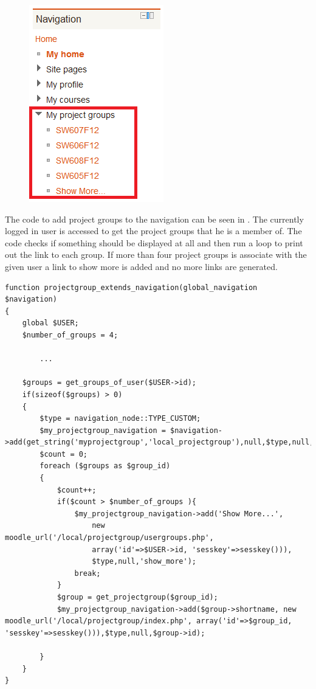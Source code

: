 \begin{figure}
	\centering
		\includegraphics[scale=0.7]{images/moodlenavigationblock.png}
	\label{fig:moodlenavigationblock}
\end{figure}

The code to add project groups to the navigation can be seen in .
The currently logged in user is accessed to get the project groups that he is a member of.
The code checks if something should be displayed at all and then run a loop to print out the link to each group. 
If more than four project groups is associate with the given user a link to show more is added and no more links are generated.


\begin{lstlisting}[style=phpCode, caption=\myCaption{The code for extending the navigation}, label=src:moodlecodeextendingnavigation]
function projectgroup_extends_navigation(global_navigation $navigation) 
{
	global $USER;
	$number_of_groups = 4;
	
		...
	
	$groups = get_groups_of_user($USER->id);
	if(sizeof($groups) > 0)
	{
		$type = navigation_node::TYPE_CUSTOM;
		$my_projectgroup_navigation = $navigation->add(get_string('myprojectgroup','local_projectgroup'),null,$type,null,'myprojectgroup');
		$count = 0;
		foreach ($groups as $group_id) 
		{
			$count++;
			if($count > $number_of_groups ){
				$my_projectgroup_navigation->add('Show More...', 
					new moodle_url('/local/projectgroup/usergroups.php',
					array('id'=>$USER->id, 'sesskey'=>sesskey())),
					$type,null,'show_more');
				break;
			}
			$group = get_projectgroup($group_id);
			$my_projectgroup_navigation->add($group->shortname, new moodle_url('/local/projectgroup/index.php', array('id'=>$group_id, 'sesskey'=>sesskey())),$type,null,$group->id);
			
		}
	}
}
\end{lstlisting}





















